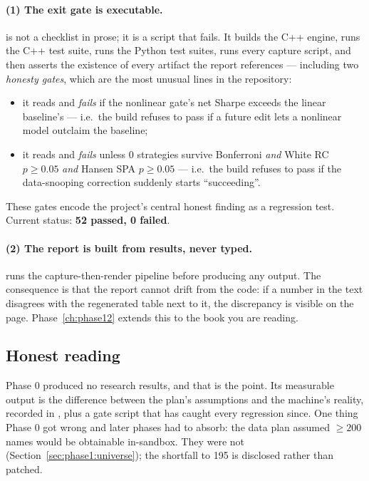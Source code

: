 \paragraph{(1) The exit gate is executable.}  is not a
checklist in prose; it is a script that fails. It builds the C++ engine, runs the C++
test suite, runs the Python test suites, runs every capture script, and then asserts the
existence of every artifact the report references --- including two \emph{honesty gates},
which are the most unusual lines in the repository:
\begin{itemize}
  \item it reads  and \emph{fails} if the
    nonlinear gate's net Sharpe exceeds the linear baseline's --- i.e.\ the build refuses
    to pass if a future edit lets a nonlinear model outclaim the baseline;
  \item it reads  and \emph{fails} unless
    $0$ strategies survive Bonferroni \emph{and} White RC $p\ge0.05$ \emph{and} Hansen
    SPA $p\ge0.05$ --- i.e.\ the build refuses to pass if the data-snooping correction
    suddenly starts ``succeeding''.
\end{itemize}
These gates encode the project's central honest finding as a regression test. Current
status: \textbf{52 passed, 0 failed}.

\paragraph{(2) The report is built from results, never typed.}
 runs the capture-then-render pipeline before producing any
output. The consequence is that the report cannot drift from the code: if a number in the
text disagrees with the regenerated table next to it, the discrepancy is visible on the
page. Phase~\ref{ch:phase12} extends this to the book you are reading.

\subsection{Honest reading}

Phase 0 produced no research results, and that is the point. Its measurable output is the
difference between the plan's assumptions and the machine's reality, recorded in
, plus a gate script that has caught every regression since.
One thing Phase 0 got wrong and later phases had to absorb: the data plan assumed
$\ge200$ names would be obtainable in-sandbox. They were not (Section~\ref{sec:phase1:universe});
the shortfall to 195 is disclosed rather than patched.

